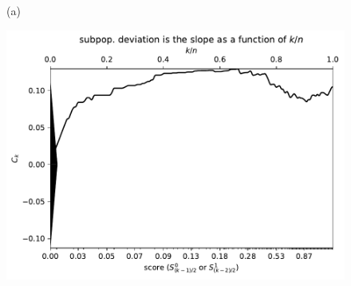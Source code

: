 \documentclass{article}
\newlength{\vertsep}
\newlength{\imsize}
\begin{document}
\begin{figure}
\begin{centering}

(a)
\parbox{\imsize}{\includegraphics[width=\imsize]
{../codes/unweighted/nll-1-323-monarch-monarch-butterfly-milkweed-butterfly-Danaus-plexippus_342-wild-boar-boar-Sus-scrofa.pdf}}

\vspace{\vertsep}


\end{centering}
\end{figure}
\end{document}
